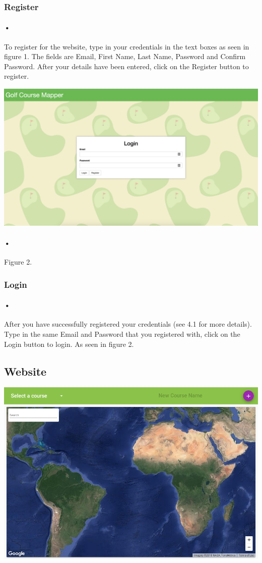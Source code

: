 \documentclass{article}
\begin{document}
	\subsubsection{Register}
	\paragraph{•}
	To register for the website, type in your credentials in the text boxes as seen in figure 1. The fields are Email, First Name, Last Name, Password and Confirm Password. After your details have been entered, click on the Register button to register.
	
		
	
	\includegraphics[scale=0.25]{Login}
	\paragraph{•}
    Figure 2.
	\subsubsection{Login}
	\paragraph{•}
	After you have successfully registered your credentials (see 4.1 for more details). Type in the same Email and Password that you registered with, click on the Login button to login. As seen in figure 2.
	
    \subsection{Website}
    \includegraphics[scale=0.4]{map}
\end{document}
